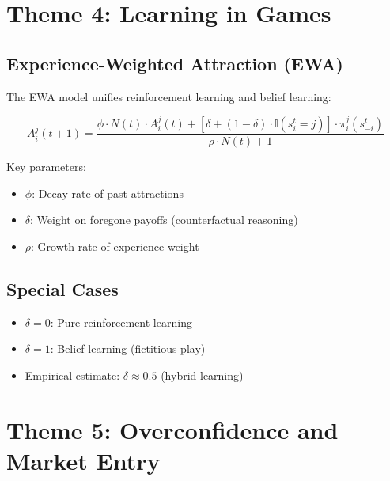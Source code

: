 \section{Theme 4: Learning in Games}
\label{sec:ca-learning}

\subsection{Experience-Weighted Attraction (EWA)}

The EWA model \citep{PAP-camerer2005frame} unifies reinforcement learning and belief learning:

\begin{equation}
A_i^j(t+1) = \frac{\phi \cdot N(t) \cdot A_i^j(t) + [\delta + (1-\delta) \cdot \mathbb{I}(s_i^t = j)] \cdot \pi_i^j(s_{-i}^t)}{\rho \cdot N(t) + 1}
\end{equation}

Key parameters:
\begin{itemize}[nosep]
\item $\phi$: Decay rate of past attractions
\item $\delta$: Weight on foregone payoffs (counterfactual reasoning)
\item $\rho$: Growth rate of experience weight
\end{itemize}

\subsection{Special Cases}

\begin{itemize}[nosep]
\item $\delta = 0$: Pure reinforcement learning
\item $\delta = 1$: Belief learning (fictitious play)
\item Empirical estimate: $\delta \approx 0.5$ (hybrid learning)
\end{itemize}


\section{Theme 5: Overconfidence and Market Entry}
\label{sec:ca-overconfidence}

